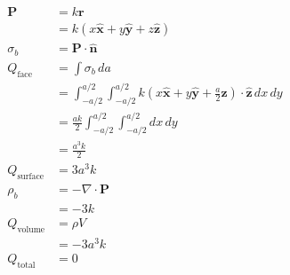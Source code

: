 \documentclass{article}
\renewcommand{\vec}[1]{\boldsymbol{\mathbf{#1}}}
\newcommand{\uvec}[1]{\hat{\vec{#1}}}
\begin{document}
\begin{align*}
  \vec{P}          & = k \vec{r}                                                                                                                              \\
                   & = k (x \uvec{x} + y \uvec{y} + z \uvec{z})                                                                                               \\
  \sigma_b         & = \vec{P} \cdot \uvec{n}                                                                                                                 \\
  Q_\text{face}    & = \int \sigma_b \,d a                                                                                                                    \\
                   & = \int_{-a / 2}^{a / 2} \int_{-a / 2}^{a / 2} k \left( x \uvec{x} + y \uvec{y} + \frac{a}{2} \uvec{z} \right) \cdot \uvec{z} \,d x \,d y \\
                   & = \frac{a k}{2} \int_{-a / 2}^{a / 2} \int_{-a / 2}^{a / 2} d x \,d y                                                                    \\
                   & = \frac{a^3 k}{2}                                                                                                                        \\
  Q_\text{surface} & = 3 a^3 k                                                                                                                                \\
  \rho_b           & = -\nabla \cdot \vec{P}                                                                                                                  \\
                   & = -3 k                                                                                                                                   \\
  Q_\text{volume}  & = \rho V                                                                                                                                 \\
                   & = -3 a^3 k                                                                                                                               \\
  Q_\text{total}   & = 0
\end{align*}
\end{document}
